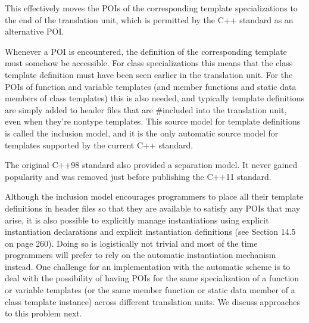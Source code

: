 This effectively moves the POIs of the corresponding template specializations to the end of the translation unit, which is permitted by the C++ standard as an alternative POI.


Whenever a POI is encountered, the definition of the corresponding template must somehow be accessible. For class specializations this means that the class template definition must have been seen earlier in the translation unit. For the POIs of function and variable templates (and member functions and static data members of class templates) this is also needed, and typically template definitions are simply added to header files that are \#included into the translation unit, even when they’re nontype templates. This source model for template definitions is  called the inclusion model, and it is the only automatic source model for templates supported by the  current C++ standard.

\begin{tcolorbox}[colback=webgreen!5!white,colframe=webgreen!75!black]
\hspace*{0.75cm}The original C++98 standard also provided a separation model. It never gained popularity and was removed just before publishing the C++11 standard.
\end{tcolorbox}

Although the inclusion model encourages programmers to place all their template definitions in header files so that they are available to satisfy any POIs that may arise, it is also possible to explicitly manage instantiations using explicit instantiation declarations and explicit instantiation definitions (see Section 14.5 on page 260). Doing so is logistically not trivial and most of the time programmers will prefer to rely on the automatic instantiation mechanism instead. One challenge for an implementation with the automatic scheme is to deal with the possibility of having POIs for the same specialization of a function or variable templates (or the same member function or static data member of a class template instance) across different translation units. We discuss approaches to this problem next.







